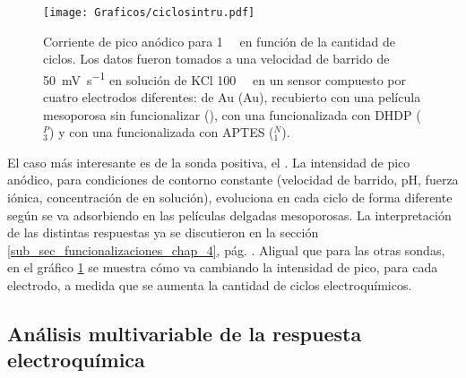 		     \begin{figure}[b!]
		 	       	\begin{center}
		 	       	\texttt{[image: Graficos/ciclosintru.pdf]}
		        	\caption[Corriente de pico de \ru\space en función del número de ciclos]{Corriente de pico anódico para \ru\space \SI{1}{\milli\Molar} en función de la cantidad de ciclos. Los datos fueron tomados a una velocidad de barrido de \SI{50}{\milli\volt\per\second} en solución de KCl \SI{100}{\milli\Molar} en un sensor compuesto por cuatro electrodos diferentes: de Au (Au), recubierto con una película mesoporosa sin funcionalizar (\pdmZ), con una funcionalizada con DHDP (\pdmZ$^P_3$) y con una funcionalizada con APTES (\pdmZ$^N_1$).}
		         	\label{fig:ruciclos}
		         	\end{center}
		     		\end{figure}

	    El caso más interesante es de la sonda positiva, el \ru. La intensidad de pico anódico, para condiciones de contorno constante (velocidad de barrido, pH, fuerza iónica, concentración de \ru\space en solución), evoluciona en cada ciclo de forma diferente según se va adsorbiendo en las películas delgadas mesoporosas. La interpretación de las distintas respuestas ya se discutieron en la sección \ref{sub_sec_funcionalizaciones_chap_4}, pág. \pageref{sub_sec_funcionalizaciones_chap_4}. Al\space igual que para las otras sondas, en el gráfico \ref{fig:ruciclos}  se muestra cómo va cambiando la intensidad de pico, para cada electrodo, a medida que se aumenta la cantidad de ciclos electroquímicos. 

	\subsection{Análisis multivariable de la respuesta electroquímica}	     		

